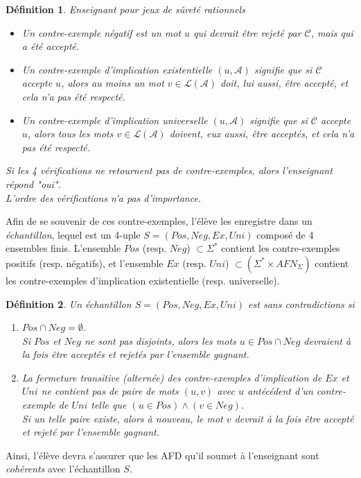 \documentclass[12pt,a4paper,oneside,titlepage]{report}
\newtheorem{defi}{D\'efinition}[section]
\begin{document}
\begin{defi}{Enseignant pour jeux de sûreté rationnels\\}
\begin{itemize}
\item Un \emph{contre-exemple négatif} est un mot $u$ qui devrait être rejeté par $\mathcal{C}$, mais qui a été accepté.
\item Un \emph{contre-exemple d'implication existentielle} $(u, \mathcal{A})$ signifie que si $\mathcal{C}$ accepte $u$, alors au moins un mot $v \in \mathcal{L}(\mathcal{A})$ doit, lui aussi, être accepté, et cela n'a pas été respecté.
\item Un \emph{contre-exemple d'implication universelle} $(u, \mathcal{A})$ signifie que si $\mathcal{C}$ accepte $u$, alors tous les mots $v \in \mathcal{L}(\mathcal{A})$ doivent, eux aussi, être acceptés, et cela n'a pas été respecté.\\
\end{itemize}
\noindent Si les 4 vérifications ne retournent pas de contre-exemples, alors l'enseignant répond "\emph{oui}".\\
L'ordre des vérifications n'a pas d'importance.
\end{defi}
Afin de se souvenir de ces contre-exemples, l'élève les enregistre dans un \emph{échantillon}, lequel est un 4-uple $S=(Pos, Neg, Ex, Uni)$ composé de 4 ensembles finis. L'ensemble $Pos$ (resp. $Neg$) $\subset\Sigma^*$ contient les contre-exemples positifs (resp. négatifs), et l'ensemble $Ex$ (resp. $Uni$) $\subset(\Sigma^*\times AFN_\Sigma)$ contient les contre-exemples d'implication existentielle (resp. universelle).
\begin{defi}
\label{contradictionfree}
Un échantillon $S=(Pos, Neg, Ex, Uni)$ est \emph{sans contradictions} si \begin{enumerate}
\item $Pos\cap Neg=\emptyset$.\\ 
Si $Pos$ et $Neg$ ne sont pas disjoints, alors les mots $u\in Pos\cap Neg$ devraient à la fois être acceptés et rejetés par l'ensemble gagnant.
\item La fermeture transitive (alternée) des contre-exemples d'implication de $Ex$ et $Uni$ ne contient pas de paire de mots $(u,v)$ avec $u$ antécédent d'un contre-exemple de $Uni$ telle que $(u\in Pos) \land (v\in Neg)$.\\
Si un telle paire existe, alors à nouveau, le mot $v$ devrait à la fois être accepté et rejeté par l'ensemble gagnant.

\end{enumerate}
\end{defi}
\noindent Ainsi, l'élève devra s'assurer que les AFD qu'il soumet à l'enseignant sont \emph{cohérents} avec l'échantillon $S$.
\end{document}
